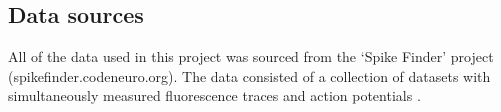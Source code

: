 \documentclass[a4paper,12pt]{article}
\theoremstyle{definition}
\begin{document}
\subsection{Data sources}
All of the data used in this project was sourced from the ‘Spike Finder’ project (spikefinder.codeneuro.org). The data consisted of a collection of datasets with simultaneously measured fluorescence traces and action potentials \cite{berens}.

\newpage


\end{document}
